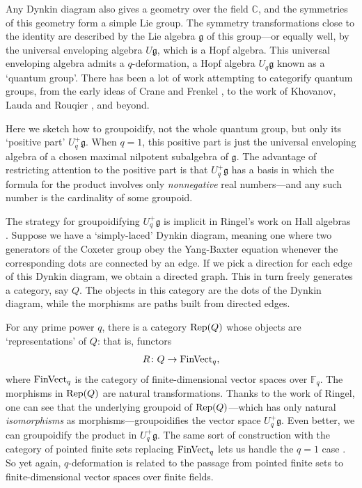 \documentclass{article}
\newcommand{\Rep}{{\rm Rep}}
\newcommand{\FinVect}{{\rm FinVect}}
\renewcommand{\to}{\rightarrow}
\newcommand{\maps}{\colon}
\newcommand{\g}{{\mathfrak g}}
\newcommand{\F}{{\mathbb F}}
\begin{document}
Any Dynkin diagram also gives a geometry over the field $\mathbb{C}$,
and the symmetries of this geometry form a simple Lie group.  The
symmetry transformations close to the identity are described by the
Lie algebra $\g$ of this group---or equally well, by the universal
enveloping algebra $U\g$, which is a Hopf algebra.  This universal
enveloping algebra admits a $q$-deformation, a Hopf algebra $U_q \g$ 
known as a `quantum group'.  There has been a lot of work attempting 
to categorify quantum groups, from the early ideas of Crane and Frenkel 
\cite{CF}, to the work of Khovanov, Lauda and Rouqier \cite{Kh2,KL,Rou2}, 
and beyond.  

Here we sketch how to groupoidify, not the whole quantum group, but only 
its `positive part' $U_q^+ \g$.  When $q = 1$, this positive part is just
the universal enveloping algebra of a chosen maximal nilpotent
subalgebra of $\g$.  The advantage of restricting attention to the
positive part is that $U_q^+ \g$ has a basis in which the formula for
the product involves only \textit{nonnegative} real numbers---and any
such number is the cardinality of some groupoid.

The strategy for groupoidifying $U_q^+ \g$ is implicit in Ringel's
work on Hall algebras \cite{Ringel}.  Suppose we have a `simply-laced'
Dynkin diagram, meaning one where two generators of the Coxeter group
obey the Yang-Baxter equation whenever the corresponding dots are
connected by an edge.  If we pick a direction for each edge of this
Dynkin diagram, we obtain a directed graph.  This in turn freely
generates a category, say $Q$.  The objects in this category are the
dots of the Dynkin diagram, while the morphisms are paths built from
directed edges.

For any prime power $q$, there is a category $\Rep(Q)$ whose
objects are `representations' of $Q$: that is, functors
\[   R \maps Q \to \FinVect_q, \]
where $\FinVect_q$ is the category of finite-dimensional vector spaces
over $\F_q$.  The morphisms in $\Rep(Q)$ are natural transformations.
Thanks to the work of Ringel, one can see that the underlying
groupoid of $\Rep(Q)$---which has only natural \textsl{isomorphisms} 
as morphisms---groupoidifies the vector space $U_q^+ \g$.  Even better, 
we can groupoidify the product in $U_q^+ \g$.  The same sort of 
construction with the category of pointed finite sets replacing 
$\FinVect_q$ lets us handle the $q = 1$ case \cite{Szczesny}.  
So yet again, $q$-deformation is related to the passage from
pointed finite sets to finite-dimensional vector spaces over finite 
fields.
\end{document}
